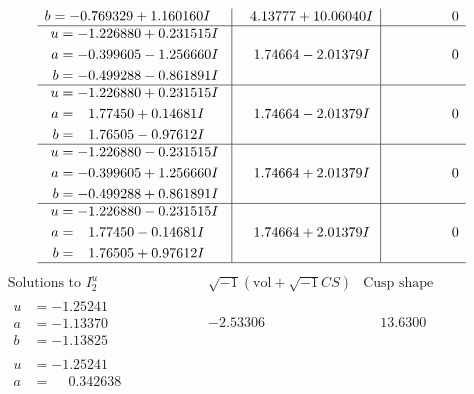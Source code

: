 \documentclass[1p]{elsarticle_modified}
\theoremstyle{definition}
\newcommand{\I}{\sqrt{-1}}
\begin{document}
$$\begin{array}{c|c|c}
\begin{aligned}
b &= -0.769329 + 1.160160 I\end{aligned}
 & \phantom{-}4.13777 + 10.06040 I & \phantom{-0.000000 } 0 \\ \hline\begin{aligned}
u &= -1.226880 + 0.231515 I \\
a &= -0.399605 - 1.256660 I \\
b &= -0.499288 - 0.861891 I\end{aligned}
 & \phantom{-}1.74664 - 2.01379 I & \phantom{-0.000000 } 0 \\ \hline\begin{aligned}
u &= -1.226880 + 0.231515 I \\
a &= \phantom{-}1.77450 + 0.14681 I \\
b &= \phantom{-}1.76505 - 0.97612 I\end{aligned}
 & \phantom{-}1.74664 - 2.01379 I & \phantom{-0.000000 } 0 \\ \hline\begin{aligned}
u &= -1.226880 - 0.231515 I \\
a &= -0.399605 + 1.256660 I \\
b &= -0.499288 + 0.861891 I\end{aligned}
 & \phantom{-}1.74664 + 2.01379 I & \phantom{-0.000000 } 0 \\ \hline\begin{aligned}
u &= -1.226880 - 0.231515 I \\
a &= \phantom{-}1.77450 - 0.14681 I \\
b &= \phantom{-}1.76505 + 0.97612 I\end{aligned}
 & \phantom{-}1.74664 + 2.01379 I & \phantom{-0.000000 } 0\\
 \hline 
 \end{array}$$\newpage$$\begin{array}{c|c|c}  
\text{Solutions to }I^u_{2}& \I (\text{vol} + \sqrt{-1}CS) & \text{Cusp shape}\\
 \hline 
\begin{aligned}
u &= -1.25241\phantom{ +0.000000I} \\
a &= -1.13370\phantom{ +0.000000I} \\
b &= -1.13825\phantom{ +0.000000I}\end{aligned}
 & -2.53306\phantom{ +0.000000I} & \phantom{-}13.6300\phantom{ +0.000000I} \\ \hline\begin{aligned}
u &= -1.25241\phantom{ +0.000000I} \\
a &= \phantom{-}0.342638\phantom{ +0.000000I} \\

\end{aligned}
\end{array}$$
\end{document}
